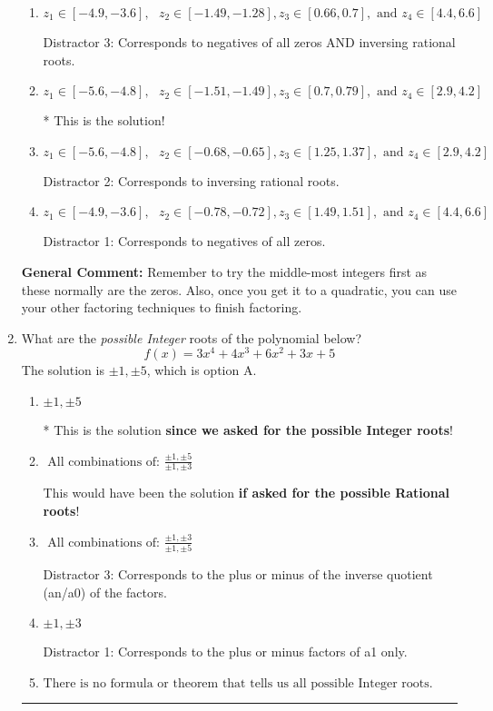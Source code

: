 \documentclass{extbook}[14pt]
\newcommand{\litem}[1]{\item #1

\rule{\textwidth}{0.4pt}}
\begin{document}
\begin{enumerate}
{\begin{enumerate}[label=\Alph*.]
 Distractor 4: Corresponds to moving factors from one rational to another.
\item \( z_1 \in [-4.9, -3.6], \text{   }  z_2 \in [-1.49, -1.28], z_3 \in [0.66, 0.7], \text{   and   } z_4 \in [4.4, 6.6] \)

 Distractor 3: Corresponds to negatives of all zeros AND inversing rational roots.
\item \( z_1 \in [-5.6, -4.8], \text{   }  z_2 \in [-1.51, -1.49], z_3 \in [0.7, 0.79], \text{   and   } z_4 \in [2.9, 4.2] \)

* This is the solution!
\item \( z_1 \in [-5.6, -4.8], \text{   }  z_2 \in [-0.68, -0.65], z_3 \in [1.25, 1.37], \text{   and   } z_4 \in [2.9, 4.2] \)

 Distractor 2: Corresponds to inversing rational roots.
\item \( z_1 \in [-4.9, -3.6], \text{   }  z_2 \in [-0.78, -0.72], z_3 \in [1.49, 1.51], \text{   and   } z_4 \in [4.4, 6.6] \)

 Distractor 1: Corresponds to negatives of all zeros.
\end{enumerate}

\textbf{General Comment:} Remember to try the middle-most integers first as these normally are the zeros. Also, once you get it to a quadratic, you can use your other factoring techniques to finish factoring.
}
\litem{
What are the \textit{possible Integer} roots of the polynomial below?
\[ f(x) = 3x^{4} +4 x^{3} +6 x^{2} +3 x + 5 \]The solution is \( \pm 1,\pm 5 \), which is option A.\begin{enumerate}[label=\Alph*.]
\item \( \pm 1,\pm 5 \)

* This is the solution \textbf{since we asked for the possible Integer roots}!
\item \( \text{ All combinations of: }\frac{\pm 1,\pm 5}{\pm 1,\pm 3} \)

This would have been the solution \textbf{if asked for the possible Rational roots}!
\item \( \text{ All combinations of: }\frac{\pm 1,\pm 3}{\pm 1,\pm 5} \)

 Distractor 3: Corresponds to the plus or minus of the inverse quotient (an/a0) of the factors. 
\item \( \pm 1,\pm 3 \)

 Distractor 1: Corresponds to the plus or minus factors of a1 only.
\item \( \text{There is no formula or theorem that tells us all possible Integer roots.} \)


\end{enumerate}}
\end{enumerate}
\end{document}
